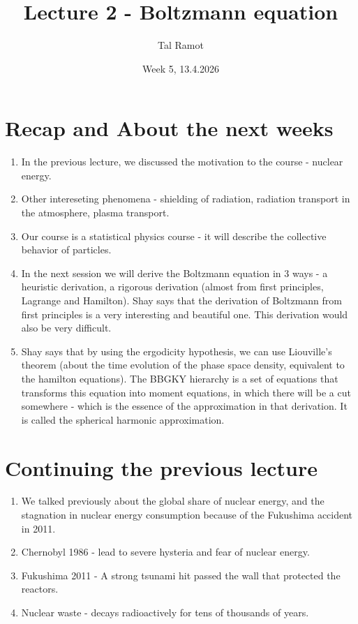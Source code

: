 \documentclass[11pt]{article}
\title{Lecture 2 - Boltzmann equation}
\author{Tal Ramot}
\date{Week 5, 13.4.2026}
\begin{document}
\maketitle
\section{Recap and About the next weeks}
\begin{enumerate}
    \item In the previous lecture, we discussed the motivation to the course - nuclear energy.
    \item Other intereseting phenomena - shielding of radiation, radiation transport in the atmosphere, plasma transport.
    \item Our course is a statistical physics course - it will describe the collective behavior of particles.
    \item In the next session we will derive the Boltzmann equation in 3 ways - a heuristic derivation, a rigorous derivation (almost from first principles, Lagrange and Hamilton). Shay says that the derivation of Boltzmann from first principles is a very interesting and beautiful one.
    This derivation would also be very difficult.
    \item Shay says that by using the ergodicity hypothesis, we can use Liouville's theorem (about the time evolution of the phase space density, equivalent to the hamilton equations). The BBGKY hierarchy is a set of equations that transforms this equation into moment equations, in which there will be a cut somewhere - which is the essence of the approximation in that derivation. It is called the spherical harmonic approximation.
\end{enumerate}

\section{Continuing the previous lecture}
\begin{enumerate}
    \item We talked previously about the global share of nuclear energy, and the stagnation in nuclear energy consumption because of the Fukushima accident in 2011.
    \item Chernobyl 1986 - lead to severe hysteria and fear of nuclear energy.
    \item Fukushima 2011 - A strong tsunami hit passed the wall that protected the reactors.
    \item Nuclear waste - decays radioactively for tens of thousands of years.    
\end{enumerate}
\end{document}
